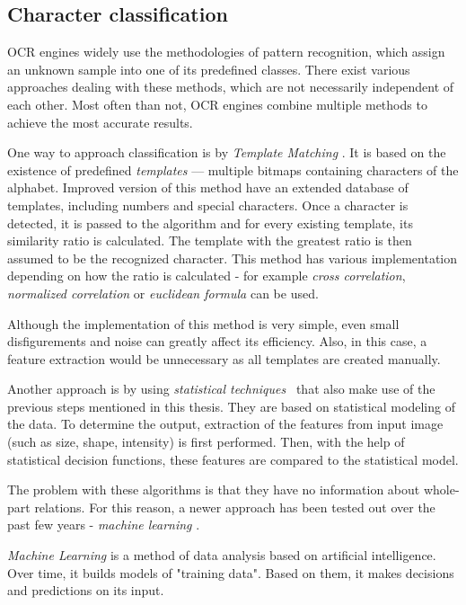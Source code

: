 \subsection{Character classification}

OCR engines widely use the methodologies of pattern recognition, which assign an unknown sample into one of its predefined classes. There exist various approaches dealing with these methods, which are not necessarily independent of each other. Most often than not, OCR engines combine multiple methods to achieve the most accurate results.

One way to approach classification is by \emph{Template Matching} \citep{templateMatching}. It is based on the existence of predefined \emph{templates} --- multiple bitmaps containing characters of the alphabet. Improved version of this method have an extended database of templates, including numbers and special characters. Once a character is detected, it is passed to the algorithm and for every existing template, its similarity ratio is calculated. The template with the greatest ratio is then assumed to be the recognized character. This method has various implementation depending on how the ratio is calculated - for example \emph{cross correlation}, \emph{normalized correlation} or \emph{euclidean formula} can be used.

Although the implementation of this method is very simple, even small disfigurements and noise can greatly affect its efficiency. Also, in this case, a feature extraction would be unnecessary as all templates are created manually.

Another approach is by using \emph{statistical techniques}~\citep{characterClassification} that also make use of the previous steps mentioned in this thesis. They are based on statistical modeling of the data. To determine the output, extraction of the features from input image (such as size, shape, intensity) is first performed. Then, with the help of statistical decision functions, these features are compared to the statistical model.

The problem with these algorithms is that they have no information about whole-part relations. For this reason, a newer approach has been tested out over the past few years - \emph{machine learning} \citep{characterClassification}.

\emph{Machine Learning} \citet{sebastiani2002machine} is a method of data analysis based on artificial intelligence. Over time, it builds models of "training data". Based on them, it makes decisions and predictions on its input. 

